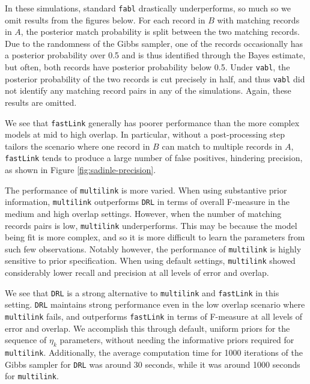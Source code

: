 \documentclass[12pt,letterpaper]{article}
\newcommand{\1}[1]{\mathbb{I}\!\left[#1\right]} %
\begin{document}
In these simulations, standard \texttt{fabl} drastically underperforms, so much so we omit results from the figures below. For each record in $B$ with matching records in $A$, the posterior match probability is split between the two matching records. Due to the randomness of the Gibbs sampler, one of the records occasionally has a posterior probability over 0.5 and is thus identified through the Bayes estimate, but often, both records have posterior probability below 0.5. Under \texttt{vabl}, the posterior probability of the two records is cut precisely in half, and thus \texttt{vabl} did not identify any matching record pairs in any of the simulations. Again, these results are omitted.

We see that \texttt{fastLink} generally has poorer performance than the more complex models at mid to high overlap. In particular, without a post-processing step tailors the scenario where one record in $B$ can match to multiple records in $A$, \texttt{fastLink} tends to produce a large number of false positives, hindering precision, as shown in Figure \ref{fig:sadinle-precision}.

The performance of \texttt{multilink} is more varied. When using substantive prior information, \texttt{multilink} outperforms \texttt{DRL} in terms of overall F-measure in the medium and high overlap settings. However, when the number of matching records pairs is low, \texttt{multilink} underperforms. This may be because the model being fit is more complex, and so it is more difficult to learn the parameters from such few observations. Notably however, the performance of \texttt{multilink} is highly sensitive to prior specification. When using default settings, \texttt{multilink} showed considerably lower recall and precision at all levels of error and overlap.




We see that \texttt{DRL} is a strong alternative to \texttt{multilink} and \texttt{fastLink} in this setting. \texttt{DRL} maintains strong performance even in the low overlap scenario where \texttt{multilink} fails, and outperforms \texttt{fastLink} in terms of F-measure at all levels of error and overlap. We accomplish this through default, uniform priors for the sequence of $\eta_k$ parameters, without needing the informative priors required for \texttt{multilink}. Additionally, the average computation time for 1000 iterations of the Gibbs sampler for \texttt{DRL} was around 30 seconds, while it was around 1000 seconds for \texttt{multilink}. 
\end{document}
